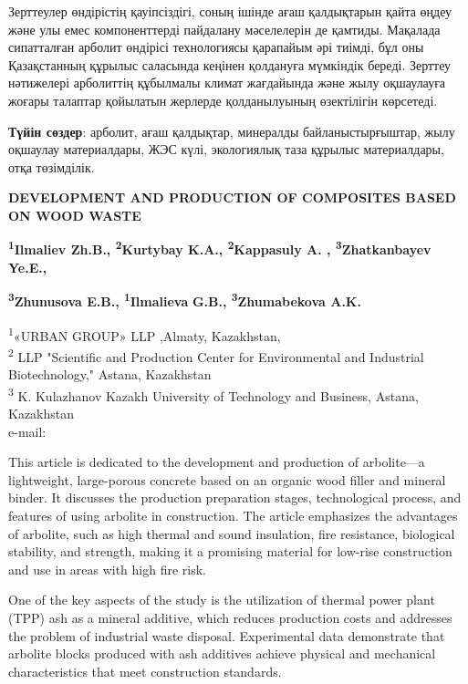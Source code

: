 Зерттеулер өндірістің қауіпсіздігі, соның ішінде ағаш қалдықтарын қайта
өңдеу және улы емес компоненттерді пайдалану мәселелерін де қамтиды.
Мақалада сипатталған арболит өндірісі технологиясы қарапайым әрі тиімді,
бұл оны Қазақстанның құрылыс саласында кеңінен қолдануға мүмкіндік
береді. Зерттеу нәтижелері арболиттің құбылмалы климат жағдайында және
жылу оқшаулауға жоғары талаптар қойылатын жерлерде қолданылуының
өзектілігін көрсетеді.

{\bfseries Түйін сөздер}: арболит, ағаш қалдықтар, минералды
байланыстырғыштар, жылу оқшаулау материалдары, ЖЭС күлі, экологиялық
таза құрылыс материалдары, отқа төзімділік.

{\bfseries DEVELOPMENT AND PRODUCTION OF COMPOSITES BASED ON WOOD WASTE}

{\bfseries \textsuperscript{1}Ilmaliev Zh.B., \textsuperscript{2}Kurtybay
K.A., \textsuperscript{2}Kappasuly A.\textsuperscript{\envelope } ,
\textsuperscript{3}Zhatkanbayev Ye.E.,}

{\bfseries \textsuperscript{3}Zhunusova E.B., \textsuperscript{1}Ilmalieva}
{\bfseries G.B., \textsuperscript{3}Zhumabekova A.K.}

\textsuperscript{1}«URBAN GROUP» LLP ,Almaty, Kazakhstan,\\
\textsuperscript{2} LLP "Scientific and Production Center for
Environmental and Industrial Biotechnology," Astana, Kazakhstan\\
\textsuperscript{3} K. Kulazhanov Kazakh University of Technology and
Business, Astana, Kazakhstan\\
e-mail: \href{mailto:kappasuly@mail.ru}{}

This article is dedicated to the development and production of
arbolite---a lightweight, large-porous concrete based on an organic wood
filler and mineral binder. It discusses the production preparation
stages, technological process, and features of using arbolite in
construction. The article emphasizes the advantages of arbolite, such as
high thermal and sound insulation, fire resistance, biological
stability, and strength, making it a promising material for low-rise
construction and use in areas with high fire risk.

One of the key aspects of the study is the utilization of thermal power
plant (TPP) ash as a mineral additive, which reduces production costs
and addresses the problem of industrial waste disposal. Experimental
data demonstrate that arbolite blocks produced with ash additives
achieve physical and mechanical characteristics that meet construction
standards.

